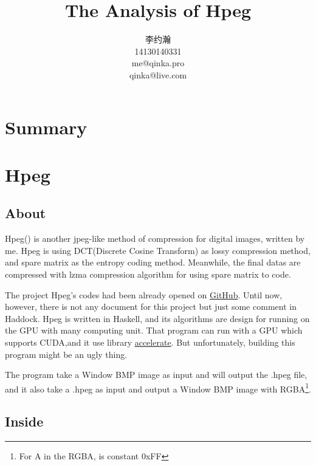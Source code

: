 \documentclass{article}
\title{The Analysis of Hpeg}
\author{李约瀚 \\ 14130140331 \\ me@qinka.pro \\ qinka@live.com}
\begin{document}
\maketitle
\newpage
\tableofcontents
\newpage

\section{Summary}
\label{sec:summary}












\section{Hpeg}
\label{sec:hpeg}

\subsection{About}
\label{sec:hpeg:about}

Hpeg() is another jpeg-like method of compression for digital images, written by me.
Hpeg is using DCT(Discrete Cosine Transform) as lossy compression method, and spare matrix as the entropy coding method.
Meanwhile, the final datas are compressed with lzma compression algorithm for using spare matrix to code. 

The project Hpeg's codes had been already opened on \href{http://github.com/Qinka/hpeg.hs}{GitHub}.
Until now, however, there is not any document for this project but just some comment in Haddock.
Hpeg is written in Haskell, and its algorithms are design for running on the GPU with many computing unit.
That program can run with a GPU which supports CUDA,and it use library \href{https://github.com/AccelerateHS/accelerate}{accelerate}.
But unfortunately, building this program might be an ugly thing.

The program take a Window BMP image as input and will output the .hpeg file,
and it also take a .hpeg as input and output a Window BMP image with RGBA\footnote{For A in the RGBA, is constant 0xFF}.

\subsection{Inside}
\label{sec:hpeg:inside}
\end{document}
